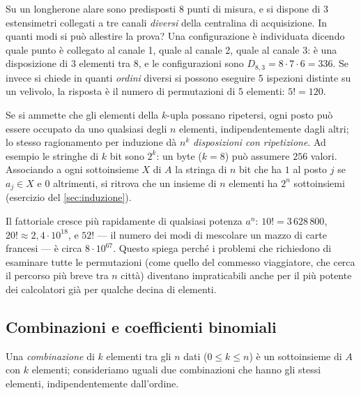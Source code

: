 \begin{esempio}\label{es:estensimetri}
Su un longherone alare sono predisposti $8$ punti di misura, e si dispone di $3$
estensimetri collegati a tre canali \emph{diversi} della centralina di acquisizione. In
quanti modi si può allestire la prova? Una configurazione è individuata dicendo quale
punto è collegato al canale 1, quale al canale 2, quale al canale 3: è una disposizione
di $3$ elementi tra $8$, e le configurazioni sono $D_{8,3}=8\cdot7\cdot6=336$. Se invece
si chiede in quanti \emph{ordini} diversi si possono eseguire $5$ ispezioni distinte su
un velivolo, la risposta è il numero di permutazioni di $5$ elementi: $5!=120$.
\end{esempio}

\begin{osservazione}
Se si ammette che gli elementi della $k$-upla possano ripetersi, ogni posto può essere
occupato da uno qualsiasi degli $n$ elementi, indipendentemente dagli altri; lo stesso
ragionamento per induzione dà $n^{k}$ \emph{disposizioni con ripetizione}. Ad esempio le
stringhe di $k$ bit sono $2^{k}$: un byte ($k=8$) può assumere $256$ valori. Associando a
ogni sottoinsieme $X$ di $A$ la stringa di $n$ bit che ha $1$ al posto $j$ se $a_{j}\in X$
e $0$ altrimenti, si ritrova che un insieme di $n$ elementi ha $2^{n}$ sottoinsiemi
(esercizio del \cref{sec:induzione}).
\end{osservazione}

\begin{attenzione}
Il fattoriale cresce più rapidamente di qualsiasi potenza $a^{n}$: $10!=3\,628\,800$,
$20!\approx2{,}4\cdot10^{18}$, e $52!$ --- il numero dei modi di mescolare un mazzo di
carte francesi --- è circa $8\cdot10^{67}$. Questo spiega perché i problemi che
richiedono di esaminare tutte le permutazioni (come quello del commesso viaggiatore, che
cerca il percorso più breve tra $n$ città) diventano impraticabili anche per il più
potente dei calcolatori già per qualche decina di elementi.
\end{attenzione}

\subsection{Combinazioni e coefficienti binomiali}

\begin{definizione}[Combinazione]
Una \emph{combinazione} di $k$ elementi tra gli $n$ dati ($0\le k\le n$) è un
sottoinsieme di $A$ con $k$ elementi; consideriamo uguali due combinazioni che hanno gli
stessi elementi, indipendentemente dall'ordine.
\end{definizione}


